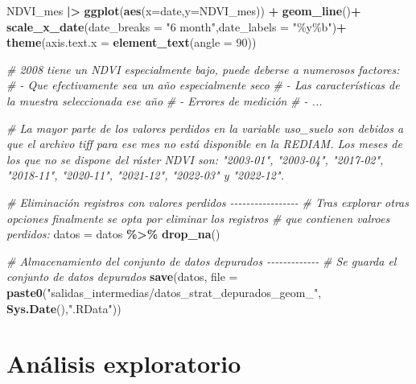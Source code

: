 \documentclass[12pt,a4paper,]{book}
\newenvironment{Shaded}{\begin{snugshade}}{\end{snugshade}}
\newcommand{\AttributeTok}[1]{\textcolor[rgb]{0.13,0.29,0.53}{#1}}
\newcommand{\CommentTok}[1]{\textcolor[rgb]{0.56,0.35,0.01}{\textit{#1}}}
\newcommand{\DecValTok}[1]{\textcolor[rgb]{0.00,0.00,0.81}{#1}}
\newcommand{\FunctionTok}[1]{\textcolor[rgb]{0.13,0.29,0.53}{\textbf{#1}}}
\newcommand{\NormalTok}[1]{#1}
\newcommand{\OtherTok}[1]{\textcolor[rgb]{0.56,0.35,0.01}{#1}}
\newcommand{\SpecialCharTok}[1]{\textcolor[rgb]{0.81,0.36,0.00}{\textbf{#1}}}
\newcommand{\StringTok}[1]{\textcolor[rgb]{0.31,0.60,0.02}{#1}}
\numberwithin{dummy}{section}
\theoremstyle{ocrenumbox}
\theoremstyle{blacknumex}
\theoremstyle{blacknumbox}
\theoremstyle{ocrenum}
\theoremstyle{ocrenum}
\begin{document}
\begin{Shaded}
\begin{Highlighting}[]
\NormalTok{NDVI\_mes }\SpecialCharTok{|\textgreater{}} 
  \FunctionTok{ggplot}\NormalTok{(}\FunctionTok{aes}\NormalTok{(}\AttributeTok{x=}\NormalTok{date,}\AttributeTok{y=}\NormalTok{NDVI\_mes)) }\SpecialCharTok{+}
  \FunctionTok{geom\_line}\NormalTok{()}\SpecialCharTok{+}
  \FunctionTok{scale\_x\_date}\NormalTok{(}\AttributeTok{date\_breaks =} \StringTok{"6 month"}\NormalTok{,}\AttributeTok{date\_labels =} \StringTok{"\%y\%b"}\NormalTok{)}\SpecialCharTok{+}
  \FunctionTok{theme}\NormalTok{(}\AttributeTok{axis.text.x =} \FunctionTok{element\_text}\NormalTok{(}\AttributeTok{angle =} \DecValTok{90}\NormalTok{))}

\CommentTok{\# 2008 tiene un NDVI especialmente bajo, puede deberse a numerosos factores:}
\CommentTok{\#   {-} Que efectivamente sea un año especialmente seco}
\CommentTok{\#   {-} Las características de la muestra seleccionada ese año}
\CommentTok{\#   {-} Errores de medición}
\CommentTok{\#   {-} ...}

\CommentTok{\# La mayor parte de los valores perdidos en la variable uso\_suelo son debidos a que el archivo tiff para ese mes no está disponible en la REDIAM. Los meses de los que no se dispone del ráster NDVI son: "2003{-}01", "2003{-}04", "2017{-}02", "2018{-}11", "2020{-}11", "2021{-}12", "2022{-}03" y "2022{-}12".}

\CommentTok{\# Eliminación registros con valores perdidos {-}{-}{-}{-}{-}{-}{-}{-}{-}{-}{-}{-}{-}{-}{-}{-}{-}}
\CommentTok{\# Tras explorar otras opciones finalmente se opta por eliminar los registros}
\CommentTok{\# que contienen valroes perdidos:}
\NormalTok{datos }\OtherTok{=}\NormalTok{ datos }\SpecialCharTok{\%\textgreater{}\%} \FunctionTok{drop\_na}\NormalTok{()}

\CommentTok{\# Almacenamiento del conjunto de datos depurados {-}{-}{-}{-}{-}{-}{-}{-}{-}{-}{-}{-}{-}}
\CommentTok{\# Se guarda el conjunto de datos depurados}
\FunctionTok{save}\NormalTok{(datos, }
     \AttributeTok{file =} \FunctionTok{paste0}\NormalTok{(}\StringTok{"salidas\_intermedias/datos\_strat\_depurados\_geom\_"}\NormalTok{,}
                   \FunctionTok{Sys.Date}\NormalTok{(),}\StringTok{".RData"}\NormalTok{))}
\end{Highlighting}
\end{Shaded}

\hypertarget{anuxe1lisis-exploratorio-1}{%
\section{Análisis exploratorio}\label{anuxe1lisis-exploratorio-1}}
\end{document}

